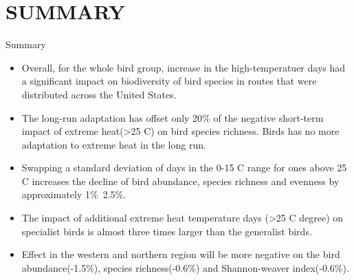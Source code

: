 \documentclass[handout]{beamer}
\begin{document}
\section*{SUMMARY}

\begin{frame}{Summary}

  \footnotesize
  \begin{itemize}
  \item
  Overall, for the whole bird group, increase in the high-temperatuer days had a significant impact on biodiversity of bird species in routes that were distributed across the United States.
  \item The long-run adaptation has offset only 20\% of the negative short-term impact of extreme heat(>25 C) on bird species richness. Birds has no more adaptation to extreme heat in the long run.
  \item
    Swapping a standard deviation of days in the 0-15 C range for ones above 25 C increases the decline of bird abundance, species richness and evenness by approximately 1\%~2.5\%.
  \item
  The impact of additional extreme heat temperature days (>25 C degree) on specialist birds is almost three times larger than the generalist birds.
  \item
  Effect in the western and northern region will be more negative on the bird abundance(-1.5\%), species richness(-0.6\%) and Shannon-weaver index(-0.6\%).
  \end{itemize}
\end{frame}
\end{document}

